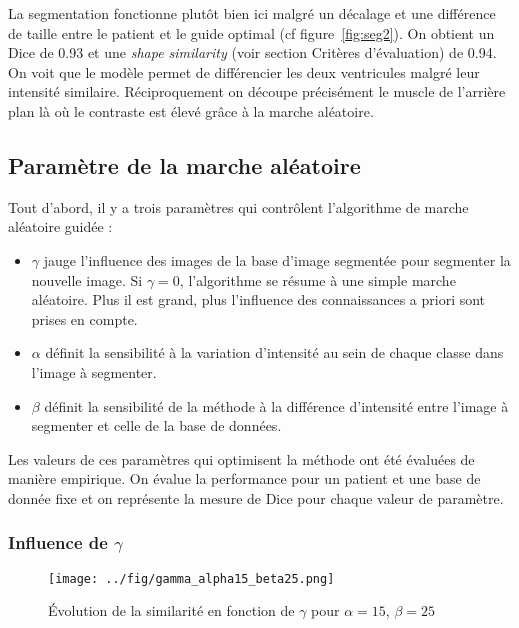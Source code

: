 \documentclass{article}
\begin{document}
La segmentation fonctionne plutôt bien ici malgré un décalage et une différence de taille entre le patient et le guide optimal (cf figure~\ref{fig:seg2}). On obtient un Dice de 0.93 et une \textit{shape similarity} (voir section Critères d'évaluation) de 0.94. On voit que le modèle permet de différencier les deux ventricules malgré leur intensité similaire. Réciproquement on découpe précisément le muscle de l'arrière plan là où le contraste est élevé grâce à la marche aléatoire.  

\clearpage

\subsection{Paramètre de la marche aléatoire}

Tout d’abord, il y a trois paramètres qui contrôlent l’algorithme de marche aléatoire guidée :  

\begin{itemize}
\item $\gamma$ jauge l’influence des images de la base d’image segmentée pour segmenter la nouvelle image. Si $\gamma=0$, l’algorithme se résume à une simple marche aléatoire. Plus il est grand, plus l’influence des connaissances a priori sont prises en compte. 

\item $\alpha$ définit la sensibilité à la variation d’intensité au sein de chaque classe dans l’image à segmenter.

\item $\beta$ définit la sensibilité de la méthode à la différence d’intensité entre l’image à segmenter et celle de la base de données. 
\end{itemize}

Les valeurs de ces paramètres qui optimisent la méthode ont été évaluées de manière empirique. On évalue la performance pour un patient et une base de donnée fixe et on représente la mesure de Dice pour chaque valeur de paramètre.

\subsubsection{Influence de $\gamma$}



\begin{figure}[h!]
  \begin{center}
    \caption{Évolution de la similarité en fonction de $\gamma$ pour $\alpha=15$, $\beta=25$}
    \texttt{[image: ../fig/gamma\_alpha15\_beta25.png]}
    \label{fig:gamma}
  \end{center}
\end{figure}
\end{document}
